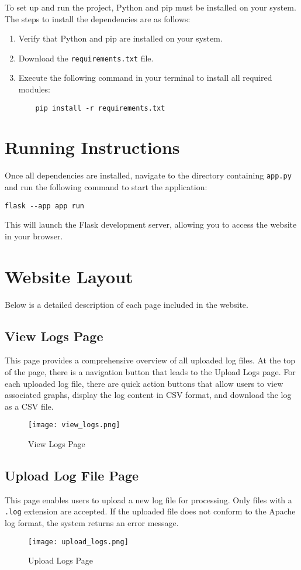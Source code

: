 \documentclass{article}
\begin{document}
To set up and run the project, Python and pip must be installed on your system. The steps to install the dependencies are as follows:
\begin{enumerate}
    \item Verify that Python and pip are installed on your system.
    \item Download the \texttt{requirements.txt} file.
    \item Execute the following command in your terminal to install all required modules:
    \begin{verbatim}
    pip install -r requirements.txt
    \end{verbatim}
\end{enumerate}

\section{Running Instructions}
Once all dependencies are installed, navigate to the directory containing \texttt{app.py} and run the following command to start the application:
\begin{verbatim}
flask --app app run
\end{verbatim}
This will launch the Flask development server, allowing you to access the website in your browser.

\section{Website Layout}
Below is a detailed description of each page included in the website.

\subsection{View Logs Page}
This page provides a comprehensive overview of all uploaded log files. At the top of the page, there is a navigation button that leads to the Upload Logs page. For each uploaded log file, there are quick action buttons that allow users to view associated graphs, display the log content in CSV format, and download the log as a CSV file.
\begin{figure}[h]
    \centering
    \texttt{[image: view\_logs.png]}
    \caption{View Logs Page}
\end{figure}

\subsection{Upload Log File Page}
This page enables users to upload a new log file for processing. Only files with a \texttt{.log} extension are accepted. If the uploaded file does not conform to the Apache log format, the system returns an error message.
\begin{figure}[h]
    \centering
    \texttt{[image: upload\_logs.png]}
    \caption{Upload Logs Page}
\end{figure}
\end{document}
